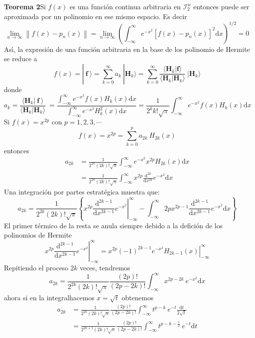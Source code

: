 \documentclass[spanish,notitlepage,letterpaper,12pt]{article}
\begin{document}
\textbf{Teorema 2}\newline Si $f(x)$ es una funci\'{o}n continua arbitraria en
$\mathcal{I}_{2}^{w}$ entonces puede ser aproximada por un polinomio en ese
mismo espacio. Es decir
\[
\lim_{n\rightarrow\infty}\left\|  f(x)-p_{n}(x)\right\|  =\lim_{n\rightarrow
\infty}\left(  \int_{-\infty}^{\infty}e^{-x^{2}}\left[  f(x)-p_{n}(x)\right]
^{2}\mathrm{d}x\right)  ^{1/2}=0
\]
As\'{\i}, la expresi\'{o}n de una funci\'{o}n arbitraria en la base de los
polinomio de Hermite se reduce a
\[
f(x)=|\ \mathbf{f\ }\rangle=\sum_{k=0}^{\infty}a_{k}\ |\mathbf{H}_{k}%
\rangle=\sum_{k=0}^{\infty}\frac{\langle\mathbf{H}_{k}|\mathbf{f}\rangle
}{\langle\mathbf{H}_{k}|\mathbf{H}_{k}\rangle}\ |\mathbf{H}_{k}\rangle
\]
donde
\[
a_{k}=\frac{\langle\mathbf{H}_{k}|\ \mathbf{f\ }\rangle}{\langle\mathbf{H}%
_{k}|\mathbf{H}_{k}\rangle}\ =\frac{\int_{-\infty}^{\infty}e^{-x^{2}}%
f(x)H_{k}(x)\mathrm{d}x}{\int_{-\infty}^{\infty}e^{-x^{2}}H_{k}^{2}%
(x)\mathrm{d}x}=\frac1{2^{k}k!\sqrt{\pi}}\int_{-\infty}^{\infty}e^{-x^{2}%
}f(x)H_{k}(x)\mathrm{d}x
\]
Si $f(x)=x^{2p}$ con $p=1,2,3,\cdots$
\[
f(x)=x^{2p}=\sum_{k=0}^{p}a_{2k}\ H_{2k}(x)
\]
entonces
\begin{align}
a_{2k}  & =\frac1{2^{2k}(2k)!\sqrt{\pi}}\int_{-\infty}^{\infty}e^{-x^{2}%
}x^{2p}H_{2k}(x)\mathrm{d}x\\[0.03in]
& =\frac1{2^{2k}(2k)!\sqrt{\pi}}\int_{-\infty}^{\infty}x^{2p}\frac
{\mathrm{d}^{2k}}{\mathrm{d}x^{2k}}e^{-x^{2}}\mathrm{d}x\nonumber
\end{align}
Una integraci\'{o}n por partes estrat\'{e}gica muestra que:
\[
a_{2k}=\frac1{2^{2k}(2k)!\sqrt{\pi}}\left\{  \left.  x^{2p}\frac
{\mathrm{d}^{2k-1}}{\mathrm{d}x^{2k-1}}e^{-x^{2}}\right|  _{-\infty}^{\infty
}-\int_{-\infty}^{\infty}2px^{2p-1}\frac{\mathrm{d}^{2k-1}}{\mathrm{d}%
x^{2k-1}}e^{-x^{2}}\mathrm{d}x\right\}
\]
El primer t\'{e}rmico de la resta se anula siempre debido a la defici\'{o}n de
los polinomios de Hermite
\[
\left.  x^{2p}\frac{\mathrm{d}^{2k-1}}{\mathrm{d}x^{2k-1}}e^{-x^{2}}\right|
_{-\infty}^{\infty}=\left.  x^{2p}(-1)^{2k-1}e^{-x^{2}}H_{2k-1}(x)\right|
_{-\infty}^{\infty}%
\]
Repitiendo el proceso $2k$ veces, tendremos
\[
a_{2k}=\frac1{2^{2k}(2k)!\sqrt{\pi}}\frac{\left(  2p\right)  !}{\left(
2p-2k\right)  !}\int_{-\infty}^{\infty}x^{2p-2k}\ e^{-x^{2}}\mathrm{d}x
\]
ahora si en la integralhacemos $x=\sqrt{t}$ obtenemos
\begin{align*}
a_{2k}  & =\frac1{2^{2k}(2k)!\sqrt{\pi}}\frac{\left(  2p\right)  !}{\left(
2p-2k\right)  !}\int_{-\infty}^{\infty}t^{p-k}\ e^{-t}\frac{\mathrm{d}%
t}{2\sqrt{t}}\\
& =\frac1{2^{2k+1}(2k)!\sqrt{\pi}}\frac{\left(  2p\right)  !}{\left(
2p-2k\right)  !}\int_{-\infty}^{\infty}t^{p-k-\frac12}\ e^{-t}\mathrm{d}t
\end{align*}
\end{document}
